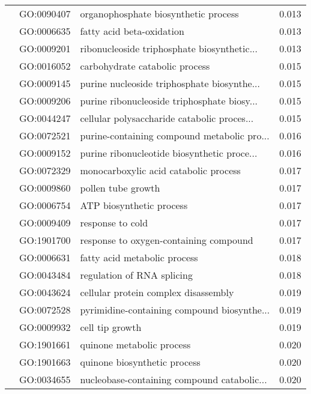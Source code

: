 \begin{longtable}{lllr}
   & GO:0090407 &         organophosphate biosynthetic process &         0.013 \\
   & GO:0006635 &                    fatty acid beta-oxidation &         0.013 \\
   & GO:0009201 &  ribonucleoside triphosphate biosynthetic... &         0.013 \\
   & GO:0016052 &               carbohydrate catabolic process &         0.015 \\
   & GO:0009145 &  purine nucleoside triphosphate biosynthe... &         0.015 \\
   & GO:0009206 &  purine ribonucleoside triphosphate biosy... &         0.015 \\
   & GO:0044247 &  cellular polysaccharide catabolic proces... &         0.015 \\
   & GO:0072521 &  purine-containing compound metabolic pro... &         0.016 \\
   & GO:0009152 &  purine ribonucleotide biosynthetic proce... &         0.016 \\
   & GO:0072329 &        monocarboxylic acid catabolic process &         0.017 \\
   & GO:0009860 &                           pollen tube growth &         0.017 \\
   & GO:0006754 &                     ATP biosynthetic process &         0.017 \\
   & GO:0009409 &                             response to cold &         0.017 \\
   & GO:1901700 &       response to oxygen-containing compound &         0.017 \\
   & GO:0006631 &                 fatty acid metabolic process &         0.018 \\
   & GO:0043484 &                   regulation of RNA splicing &         0.018 \\
   & GO:0043624 &         cellular protein complex disassembly &         0.019 \\
   & GO:0072528 &  pyrimidine-containing compound biosynthe... &         0.019 \\
   & GO:0009932 &                              cell tip growth &         0.019 \\
   & GO:1901661 &                    quinone metabolic process &         0.020 \\
   & GO:1901663 &                 quinone biosynthetic process &         0.020 \\
   & GO:0034655 &  nucleobase-containing compound catabolic... &         0.020 \\

\end{longtable}
